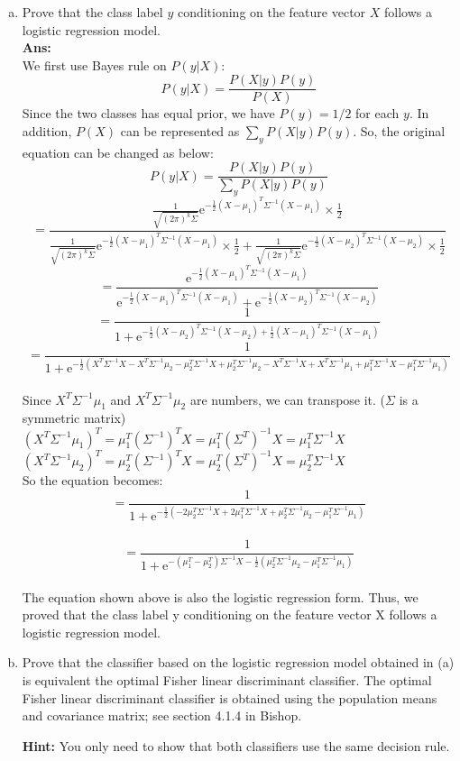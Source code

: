 \documentclass[11pt]{article}
\begin{document}
\begin{enumerate}[(a)]
\item Prove that the class label $y$ conditioning on the feature vector $X$ follows a logistic regression model.\\
\textbf{Ans:}\\
We first use Bayes rule on $P(y|X)$:
$$P(y | X) = \frac{P(X | y)P(y)}{P(X)}$$
Since the two classes has equal prior, we have $P(y) = 1/2$ for each $y$.  In addition, $P(X)$ can be represented as $\sum_{y}P(X|y)P(y)$. So, the original equation can be changed as below:\\

$$P(y|X) = \frac{P(X | y)P(y)}{\sum_{y}P(X|y)P(y)}$$
%
$$= \frac{\frac{1}{\sqrt{(2\pi)^k\Sigma}}\mathrm{e}^{-\frac{1}{2}(X-\mu_1)^T\Sigma^{-1}(X-\mu_1)} \times \frac{1}{2}}
{\frac{1}{\sqrt{(2\pi)^k\Sigma}}\mathrm{e}^{-\frac{1}{2}(X-\mu_1)^T\Sigma^{-1}(X-\mu_1)}\times \frac{1}{2} + 
 \frac{1}{\sqrt{(2\pi)^k\Sigma}}\mathrm{e}^{-\frac{1}{2}(X-\mu_2)^T\Sigma^{-1}(X-\mu_2)}\times \frac{1}{2}}$$
%
$$=\frac{\mathrm{e}^{-\frac{1}{2}(X-\mu_1)^T\Sigma^{-1}(X-\mu_1)}}
{\mathrm{e}^{-\frac{1}{2}(X-\mu_1)^T\Sigma^{-1}(X-\mu_1)} + 
\mathrm{e}^{-\frac{1}{2}(X-\mu_2)^T\Sigma^{-1}(X-\mu_2)}}$$
%
$$=\frac{1}{1+\mathrm{e}^{-\frac{1}{2}(X-\mu_2)^T\Sigma^{-1}(X-\mu_2) + \frac{1}{2}(X-\mu_1)^T\Sigma^{-1}(X-\mu_1)}}$$
%
$$=\frac{1}{1+\mathrm{e}^{ -\frac{1}{2}
(X^T\Sigma^{-1}X 
- X^T\Sigma^{-1}\mu_2 
- \mu_2^T\Sigma^{-1}X 
+ \mu_2^T\Sigma^{-1}\mu_2 
- X^T\Sigma^{-1}X
+X^T\Sigma^{-1}\mu_1
+\mu_1^T\Sigma^{-1}X
- \mu_1^T\Sigma^{-1}\mu_1    )}}$$\\
%
Since $X^T\Sigma^{-1}\mu_1$ and $X^T\Sigma^{-1}\mu_2$ are numbers, we can transpose it. ($\Sigma$ is a symmetric matrix)\\
$(X^T\Sigma^{-1}\mu_1)^T = \mu_1^T(\Sigma^{-1})^TX = \mu_1^T(\Sigma^T)^{-1}X = \mu_1^T\Sigma^{-1}X$\\
$(X^T\Sigma^{-1}\mu_2)^T = \mu_2^T(\Sigma^{-1})^TX = \mu_2^T(\Sigma^T)^{-1}X = \mu_2^T\Sigma^{-1}X$\\
%
So the equation becomes:\\
$$=\frac{1}{1+\mathrm{e}^{ -\frac{1}{2}(
-2\mu_2^T\Sigma^{-1}X + 2\mu_1^T\Sigma^{-1}X
+ \mu_2^T\Sigma^{-1}\mu_2
- \mu_1^T\Sigma^{-1}\mu_1
 )}}$$\\
 $$=\frac{1}{1+\mathrm{e}^{ 
 -(\mu_1^T-\mu_2^T)\Sigma^{-1}X
 - \frac{1}{2}( \mu_2^T\Sigma^{-1}\mu_2
- \mu_1^T\Sigma^{-1}\mu_1)
 }}$$\\
The equation shown above is also the logistic regression form. Thus, we proved that the class label y conditioning on the feature vector X follows a logistic regression model.



\item Prove that the classifier based on the logistic regression model obtained in (a) is equivalent the optimal Fisher linear discriminant classifier.  The optimal Fisher linear discriminant classifier is obtained using the population means and covariance matrix; see section 4.1.4 in Bishop.

{\bf Hint:} You only need to show that both classifiers use the same decision rule.
\end{enumerate}
\end{document}
